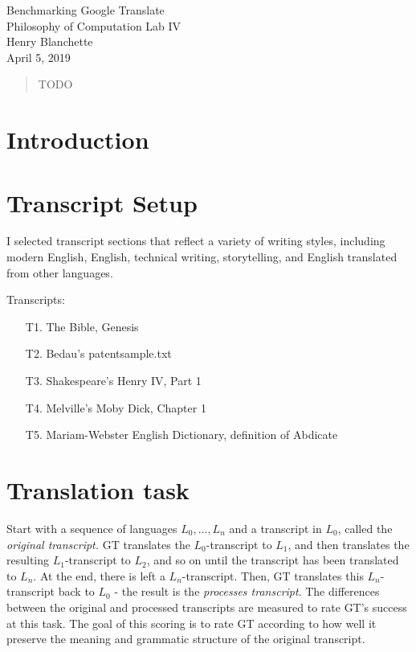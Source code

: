 \documentclass{article}
\begin{document}
\begin{center}{\huge   Benchmarking Google Translate }\\[0.4cm]{\large  Philosophy of Computation Lab IV }\\[0.75cm]{\large  Henry Blanchette }\\[0.5cm]{\large  April 5, 2019 }\\[1.0cm]\begin{abstract}
    TODO
\end{abstract}\end{center} \section{Introduction}\section{Transcript Setup}


I selected transcript sections that reflect a variety of writing styles, including modern English, English, technical writing, storytelling, and English translated from other languages.




\vspace{1em} \noindent
Transcripts:
\begin{enumerate}
  \item[T1.] The Bible, Genesis
  \item[T2.] Bedau's patentsample.txt
  \item[T3.] Shakespeare's Henry IV, Part 1
  \item[T4.] Melville's Moby Dick, Chapter 1
  \item[T5.] Mariam-Webster English Dictionary, definition of Abdicate
\end{enumerate}

\section{Translation task}


Start with a sequence of languages $L_0, \dots, L_n$ and a transcript in $L_0$, called the \textit{original transcript.}
GT translates the $L_0$-transcript to $L_1$, and then translates the resulting $L_1$-transcript to $L_2$, and so on until the transcript has been translated to $L_n$.
At the end, there is left a $L_n$-transcript.
Then, GT translates this $L_n$-transcript back to $L_0$ - the result is the \textit{processes transcript}.
The differences between the original and processed transcripts are measured to rate GT's success at this task.
The goal of this scoring is to rate GT according to how well it preserve the meaning and grammatic structure of the original transcript.
\end{document}
